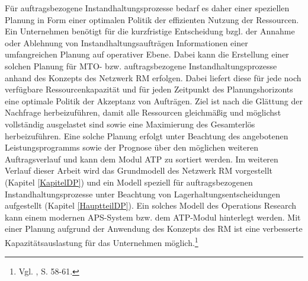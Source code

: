 Für auftragsbezogene Instandhaltungsprozesse bedarf es daher einer speziellen Planung in Form einer optimalen Politik der effizienten Nutzung der Ressourcen. Ein Unternehmen benötigt für die kurzfristige Entscheidung bzgl. der Annahme oder Ablehnung von Instandhaltungsaufträgen Informationen einer umfangreichen Planung auf operativer Ebene. Dabei kann die Erstellung einer solchen Planung für MTO- bzw. auftragsbezogene Instandhaltungsprozesse anhand des Konzepts des Netzwerk RM erfolgen. Dabei liefert diese für jede noch verfügbare Ressourcenkapazität und für jeden Zeitpunkt des Planungshorizonts eine optimale Politik der Akzeptanz von Aufträgen. Ziel ist nach \cite{Petrick:2009aa} die Glättung der Nachfrage herbeizuführen, damit alle Ressourcen gleichmäßig und möglichst vollständig ausgelastet sind sowie eine Maximierung des Gesamterlös herbeizuführen. Eine solche Planung erfolgt unter Beachtung des angebotenen Leistungsprogramms sowie der Prognose über den möglichen weiteren Auftragsverlauf und kann dem Modul ATP zu sortiert werden. Im weiteren Verlauf dieser Arbeit wird das Grundmodell des Netzwerk RM vorgestellt (Kapitel \ref{KapitelDP}) und ein Modell speziell für auftragsbezogenen Instandhaltungsprozesse unter Beachtung von Lagerhaltungsentscheidungen aufgestellt (Kapitel \ref{HauptteilDP}). Ein solches Modell des Operations Research kann einem modernen APS-System bzw. dem ATP-Modul hinterlegt werden. Mit einer Planung aufgrund der Anwendung des Konzepts des RM ist eine verbesserte Kapazitätsauslastung für das Unternehmen möglich.\footnote{Vgl. \cite{Petrick:2009aa}, S. 58-61.}





